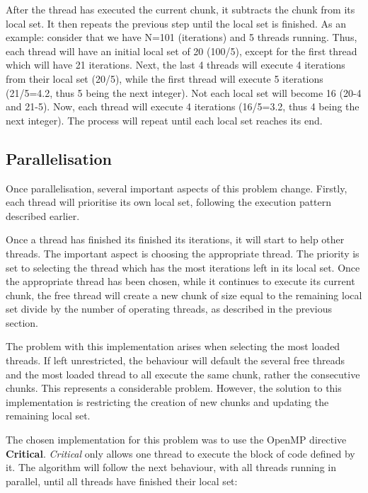 \documentclass[12pt]{article}
\begin{document}
	After the thread has executed the current chunk, it subtracts the chunk from its local set. It then repeats the previous step until the local set is finished. As an example: consider that we have N=101 (iterations) and 5 threads running. Thus, each thread will have an initial local set of 20 (100/5), except for the first thread which will have 21 iterations. Next, the last 4 threads will execute 4 iterations from their local set (20/5), while the first thread will execute 5 iterations (21/5=4.2, thus 5 being the next integer). Not each local set will become 16 (20-4 and 21-5). Now, each thread will execute 4 iterations (16/5=3.2, thus 4 being the next integer). The process will repeat until each local set reaches its end.
	
	
	\subsection{Parallelisation}
	Once parallelisation, several important aspects of this problem change. Firstly, each thread will prioritise its own local set, following the execution pattern described earlier. 
	
	Once a thread has finished its finished its iterations, it will start to help other threads. The important aspect is choosing the appropriate thread. The priority is set to selecting the thread which has the most iterations left in its local set. Once the appropriate thread has been chosen, while it continues to execute its current chunk, the free thread will create a new chunk of size equal to the remaining local set divide by the number of operating threads, as described in the previous section. 
	
	The problem with this implementation arises when selecting the most loaded threads. If left unrestricted, the behaviour will default the several free threads and the most loaded thread to all execute the same chunk, rather the consecutive chunks. This represents a considerable problem. However, the solution to this implementation is restricting the creation of new chunks and updating the remaining local set. 
	
	The chosen implementation for this problem was to use the OpenMP directive \textbf{Critical}. \textit{Critical} only allows one thread to execute the block of code defined by it. The algorithm will follow the next behaviour, with all threads running in parallel, until all threads have finished their local set:
	
\end{document}
